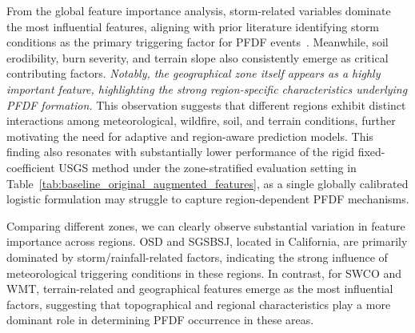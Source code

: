 From the global feature importance analysis, storm-related variables dominate the most influential features, aligning with prior literature identifying storm conditions as the primary triggering factor for PFDF events~\cite{staley2016}. Meanwhile, soil erodibility, burn severity, and terrain slope also consistently emerge as critical contributing factors. \textit{Notably, the geographical zone itself appears as a highly important feature, highlighting the strong region-specific characteristics underlying PFDF formation.} This observation suggests that different regions exhibit distinct interactions among meteorological, wildfire, soil, and terrain conditions, further motivating the need for adaptive and region-aware prediction models. This finding also resonates with substantially lower performance of the rigid fixed-coefficient USGS method under the zone-stratified evaluation setting in Table~\ref{tab:baseline_original_augmented_features}, as a single globally calibrated logistic formulation may struggle to capture region-dependent PFDF mechanisms.

Comparing different zones, we can clearly observe substantial variation in feature importance across regions. OSD and SGSBSJ, located in California, are primarily dominated by storm/rainfall-related factors, indicating the strong influence of meteorological triggering conditions in these regions. In contrast, for SWCO and WMT, terrain-related and geographical features emerge as the most influential factors, suggesting that topographical and regional characteristics play a more dominant role in determining PFDF occurrence in these areas.

